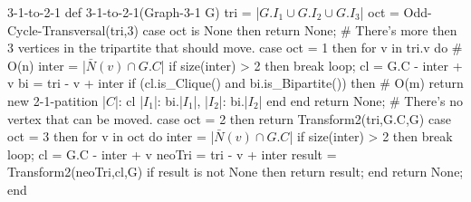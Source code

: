 \begin{code}{3-1-to-2-1}
def 3-1-to-2-1(Graph-3-1 G)
  tri = |$G.I_1 \cup G.I_2 \cup G.I_3$|
  oct = Odd-Cycle-Transversal(tri,3)
  case oct is None then
    return None; # There's more then 3 vertices in the tripartite that should move.
  case oct = 1 then
    for v in tri.v do # O(n)
      inter = |$\bar{N}(v) \cap G.C$|
      if size(inter) > 2 then
        break loop;
      cl = G.C - inter + v
      bi = tri - v + inter
      if (cl.is_Clique() and bi.is_Bipartite()) then # O(m)
        return new 2-1-patition{
          |$C$|: cl
          |$I_1$|: bi.|$I_1$|,
          |$I_2$|: bi.|$I_2$|
        }
      end
    end
    return None; # There's no vertex that can be moved.
  case oct = 2 then
    return Transform2(tri,G.C,G)
  case oct = 3 then
    for v in oct do
      inter = |$\bar{N}(v) \cap G.C$|
      if size(inter) > 2 then
        break loop;
      cl = G.C - inter + v
      neoTri = tri - v + inter
      result = Transform2(neoTri,cl,G)
      if result is not None then
        return result;
    end
    return None;
end
\end{code}

